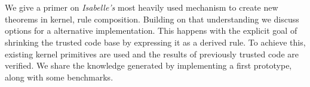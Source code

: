 \chapter{\abstractname}

We give a primer on \textit{Isabelle's} most heavily used mechanism to create new theorems in kernel, rule composition. Building on that understanding we discuss options for a alternative implementation. This happens with the explicit goal of shrinking the trusted code base by expressing it as a derived rule. To achieve this, existing kernel primitives are used and the results of previously trusted code are verified. We share the knowledge generated by implementing a first prototype, along with some benchmarks.
